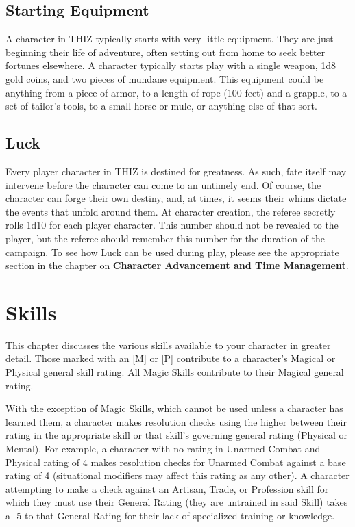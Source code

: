 \documentclass[oneside]{book}
\begin{document}
\onecolumn
\section{Starting Equipment}
A character in THIZ typically starts with very little equipment. They are just beginning their life of adventure, often setting out from home to seek better fortunes elsewhere. A character typically starts play with a single weapon, 1d8 gold coins, and two pieces of mundane equipment. This equipment could be anything from a piece of armor, to a length of rope (100 feet) and a grapple, to a set of tailor's tools, to a small horse or mule, or anything else of that sort. 

\section{Luck}
Every player character in THIZ is destined for greatness. As such, fate itself may intervene before the character can come to an untimely end. Of course, the character can forge their own destiny, and, at times, it seems their whims dictate the events that unfold around them.  At character creation, the referee secretly rolls 1d10 for each player character. This number should not be revealed to the player, but the referee should remember this number for the duration of the campaign. To see how Luck can be used during play, please see the appropriate section in the chapter on \textbf{Character Advancement and Time Management}.

\chapter{Skills}
This chapter discusses the various skills available to your character in greater detail. Those marked with an [M] or [P] contribute to a character's Magical or Physical general skill rating. All Magic Skills contribute to their Magical general rating.

With the exception of Magic Skills, which cannot be used unless a character has learned them, a character makes resolution checks using the higher between their rating in the appropriate skill or that skill's governing general rating (Physical or Mental). For example, a character with no rating in Unarmed Combat and Physical rating of 4 makes resolution checks for Unarmed Combat against a base rating of 4 (situational modifiers may affect this rating as any other). A character attempting to make a check against an Artisan, Trade, or Profession skill for which they must use their General Rating (they are untrained in said Skill) takes a -5 to that General Rating for their lack of specialized training or knowledge.
\end{document}
